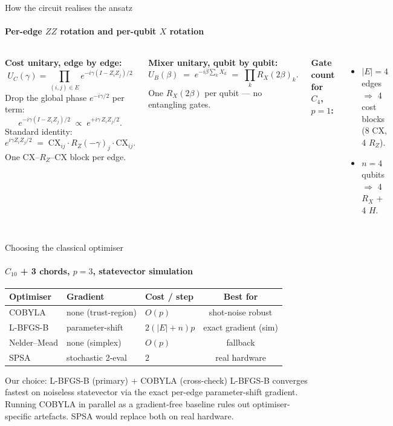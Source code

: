 \documentclass[aspectratio=169,11pt]{beamer}
\newcommand{\UC}{U_{C}}
\newcommand{\UB}{U_{B}}
\begin{document}
\begin{frame}{How the circuit realises the ansatz}
  \framesubtitle{Per-edge $ZZ$ rotation and per-qubit $X$ rotation}
  \begin{columns}[T,onlytextwidth]
      \textbf{Cost unitary, edge by edge:}
      \[
        \UC(\gamma) = \!\!\prod_{(i,j)\in E}\!\! e^{-i\gamma(I-Z_iZ_j)/2}
      \]
      Drop the global phase $e^{-i\gamma/2}$ per term:
      \[
        e^{-i\gamma(I-Z_iZ_j)/2} \;\propto\; e^{+i\gamma\,Z_iZ_j/2}.
      \]
      Standard identity:
      \[
        e^{i\gamma Z_iZ_j/2}
        \;=\; \mathrm{CX}_{ij}\cdot R_Z(-\gamma)_j\cdot \mathrm{CX}_{ij}.
      \]
      One CX--$R_Z$--CX block per edge.

      \textbf{Mixer unitary, qubit by qubit:}
      \[
        \UB(\beta) \;=\; e^{-i\beta \sum_k X_k}
                   \;=\; \prod_{k} R_X(2\beta)_k.
      \]
      One $R_X(2\beta)$ per qubit --- no entangling gates.

      \vspace{0.8em}
      \textbf{Gate count for $C_4$, $p=1$:}
      \begin{itemize}\setlength{\itemsep}{1pt}
        \item $|E|=4$ edges $\Rightarrow$ 4 cost blocks
              (8 CX, 4 $R_Z$).
        \item $n=4$ qubits $\Rightarrow$ 4 $R_X$ + 4 $H$.
      \end{itemize}
  \end{columns}
\end{frame}

\begin{frame}{Choosing the classical optimiser}
  \framesubtitle{$C_{10}$ + 3 chords, $p=3$, statevector simulation}
  \centering
  \begin{tabular}{lllc}
    \toprule
    Optimiser    & Gradient            & Cost / step & Best for \\
    \midrule
    COBYLA       & none (trust-region) & $O(p)$      & shot-noise robust \\
    L-BFGS-B     & parameter-shift     & $2(|E|+n)p$ & exact gradient (sim) \\
    Nelder--Mead & none (simplex)      & $O(p)$      & fallback \\
    SPSA         & stochastic 2-eval   & $2$         & real hardware \\
    \bottomrule
  \end{tabular}

  \vspace{0.6em}
  \begin{block}{Our choice: L-BFGS-B (primary) + COBYLA (cross-check)}
    L-BFGS-B converges fastest on noiseless statevector via the exact
    per-edge parameter-shift gradient. Running COBYLA in parallel as a
    gradient-free baseline rules out optimiser-specific artefacts.
    SPSA would replace both on real hardware.
  \end{block}
\end{frame}
\end{document}
